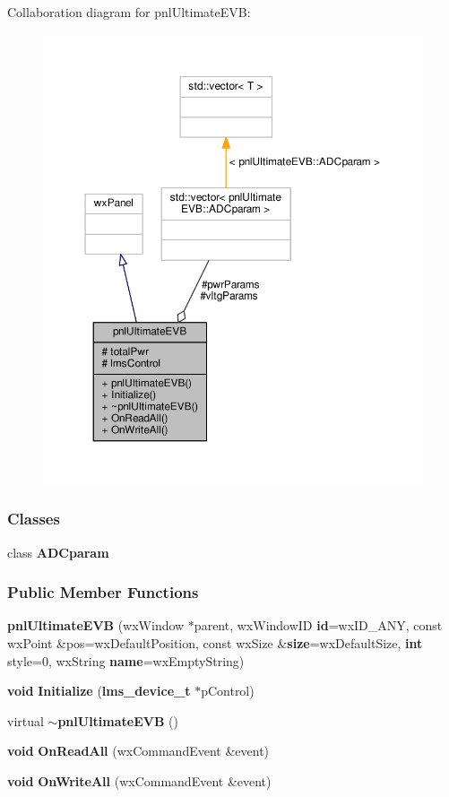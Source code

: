 Collaboration diagram for pnl\+Ultimate\+E\+VB\+:
\nopagebreak
\begin{figure}[H]
\begin{center}
\leavevmode
\includegraphics[width=350pt]{db/de2/classpnlUltimateEVB__coll__graph}
\end{center}
\end{figure}
\subsubsection*{Classes}
\begin{DoxyCompactItemize}
\item 
class {\bf A\+D\+Cparam}
\end{DoxyCompactItemize}
\subsubsection*{Public Member Functions}
\begin{DoxyCompactItemize}
\item 
{\bf pnl\+Ultimate\+E\+VB} (wx\+Window $\ast$parent, wx\+Window\+ID {\bf id}=wx\+I\+D\+\_\+\+A\+NY, const wx\+Point \&pos=wx\+Default\+Position, const wx\+Size \&{\bf size}=wx\+Default\+Size, {\bf int} style=0, wx\+String {\bf name}=wx\+Empty\+String)
\item 
{\bf void} {\bf Initialize} ({\bf lms\+\_\+device\+\_\+t} $\ast$p\+Control)
\item 
virtual {\bf $\sim$pnl\+Ultimate\+E\+VB} ()
\item 
{\bf void} {\bf On\+Read\+All} (wx\+Command\+Event \&event)
\item 
{\bf void} {\bf On\+Write\+All} (wx\+Command\+Event \&event)
\end{DoxyCompactItemize}
